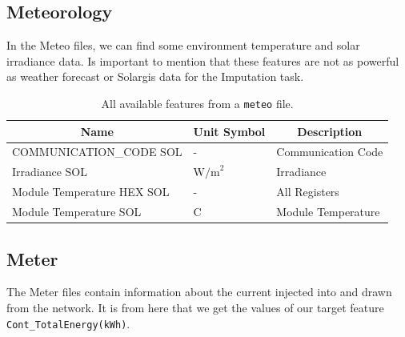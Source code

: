 \subsection{Meteorology}
In the Meteo files, we can find some environment
temperature and solar irradiance data. Is important to mention that these
features are not as powerful as
weather forecast or Solargis data for the Imputation task.


\begin{table}[H]
	\begin{center}
		\begin{tabular}[c]{l|l|l}
			\hline
			\multicolumn{1}{c|}{\textbf{Name}}        &
			\multicolumn{1}{c|}{\textbf{Unit Symbol}} &
			\multicolumn{1}{c}{\textbf{Description}}                                        \\
			\hline
			COMMUNICATION\_CODE SOL                   & -              & Communication Code \\
			Irradiance SOL                            & $\text{W/m}^2$ & Irradiance         \\
			Module Temperature HEX SOL                & -              & All Registers      \\
			Module Temperature SOL                    & C              & Module Temperature \\
			\hline
		\end{tabular}
		\caption{All available features from a \texttt{meteo} file.}\label{tab:solargisfeatures}
	\end{center}
\end{table}

\subsection{Meter}
The Meter files contain information about the current injected
into and drawn from the network. It is from here that we get
the values of our target feature \verb|Cont_TotalEnergy(kWh)|.


